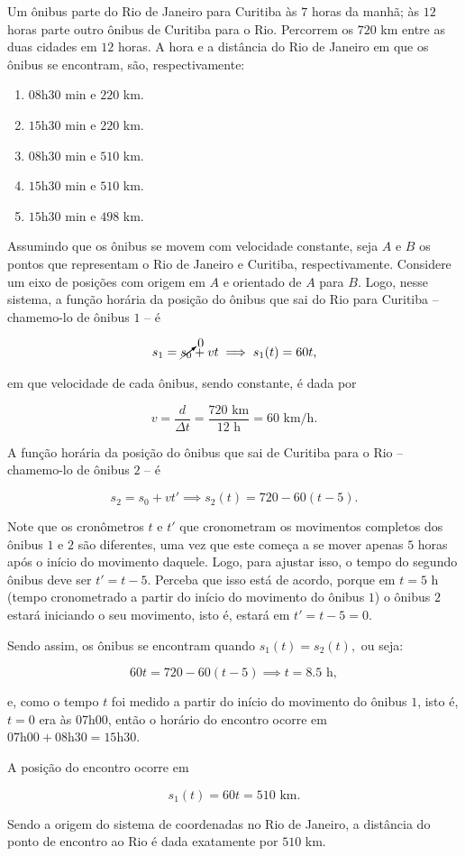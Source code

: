 \begin{exemplo}\label{exemplo_funcaohorariaposicaomu03}


Um ônibus parte do Rio de Janeiro para Curitiba às $7$ horas da manhã; às $12$ horas parte outro ônibus de Curitiba para o Rio. Percorrem os $720$ km entre as duas cidades em $12$ horas. A hora e a distância do Rio de Janeiro em que os ônibus se encontram, são, respectivamente:
\begin{enumerate}
\item[(a)] $08$h$30$ min e $220$ km.
\item[(b)] $15$h$30$ min e $220$ km.
\item[(c)] $08$h$30$ min e $510$ km.
\item[(d)] $15$h$30$ min e $510$ km.
\item[(e)] $15$h$30$ min e $498$ km.
\end{enumerate}


\resolucao


 Assumindo que os ônibus se movem com velocidade constante, seja $A$ e $B$ os pontos que representam o Rio de Janeiro e Curitiba, respectivamente. Considere um eixo de posições com origem em $A$ e orientado de $A$ para $B$. Logo, nesse sistema, a função horária da posição do ônibus que sai do Rio para Curitiba -- chamemo-lo de ônibus $1$ -- é

$$ s_1 = \cancelto{0}{s_0}+vt \implies s_1(t)=60t,$$

\noindent em que  velocidade de cada ônibus, sendo constante, é dada por

$$ v= \dfrac{d}{\Delta t} = \dfrac{720 \text{ km}}{12 \text{ h}}= 60 \text{ km/h.}$$

A função horária da posição do ônibus que sai de Curitiba para o Rio -- chamemo-lo de ônibus $2$ -- é

$$ s_2 = s_0 + vt' \implies s_2(t)=720-60(t-5).$$

Note que os cronômetros $t$ e $t'$ que cronometram os movimentos completos dos ônibus $1$ e $2$ são diferentes, uma vez que este começa a se mover apenas $5$ horas após o início do movimento daquele. Logo, para ajustar isso, o tempo do segundo ônibus deve ser $t'=t-5$. Perceba que isso está de acordo, porque em $t=5$ h (tempo cronometrado a partir do início do movimento do ônibus $1$) o ônibus $2$ estará iniciando o seu movimento, isto é, estará em $t'=t-5=0.$

Sendo assim, os ônibus se encontram quando $s_1(t)=s_2(t),$ ou seja:

$$ 60t = 720-60(t-5) \implies \boxed{t=8.5 \text{ h},}$$

\noindent e, como o tempo $t$ foi medido a partir do início do movimento do ônibus $1$, isto é, $t=0$ era às 07h00, então o horário do encontro ocorre em $07\text{h}00+08\text{h}30=15\text{h}30.$

A posição do encontro ocorre em

$$ s_1(t) = 60t =  \boxed{510 \text{ km}.}$$

Sendo a origem do sistema de coordenadas no Rio de Janeiro, a distância do ponto de encontro ao Rio é dada exatamente por $510$ km.
 

\end{exemplo}


